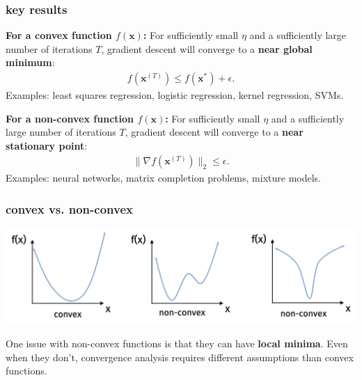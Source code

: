 \documentclass[compress]{beamer}
\newcommand{\bv}[1]{\mathbf{#1}}
\begin{document}
\begin{frame}[t]
	\frametitle{key results}
	\textbf{For a convex function $f(\bv{x})$:}
	For sufficiently small $\eta$ and a sufficiently large number of iterations $T$, gradient descent will converge to a \alert{\textbf{near global minimum}}:
	\begin{align*}
		f(\bv{x}^{(T)}) \leq  f(\bv{x}^{*}) + \epsilon.  
	\end{align*}
	Examples: least squares regression, logistic regression, kernel regression, SVMs.
	
	\textbf{For a non-convex function $f(\bv{x})$:}
	For sufficiently small $\eta$ and  a sufficiently large number of iterations $T$, gradient descent will converge to a \alert{\textbf{near stationary point}}:
	\begin{align*}
		\|\nabla f(\bv{x}^{(T)})\|_2 \leq  \epsilon.  
	\end{align*}
	Examples: neural networks, matrix completion problems, mixture models. 	
\end{frame}

\begin{frame}[t]
	\frametitle{convex vs. non-convex}
	\begin{center}
		\includegraphics[width=\textwidth]{nonconvex_converge.png}
	\end{center}
	One issue with non-convex functions is that they can have \alert{\textbf{local minima}}. Even when they don't, convergence analysis requires different assumptions than convex functions. 	
\end{frame}
\end{document}
